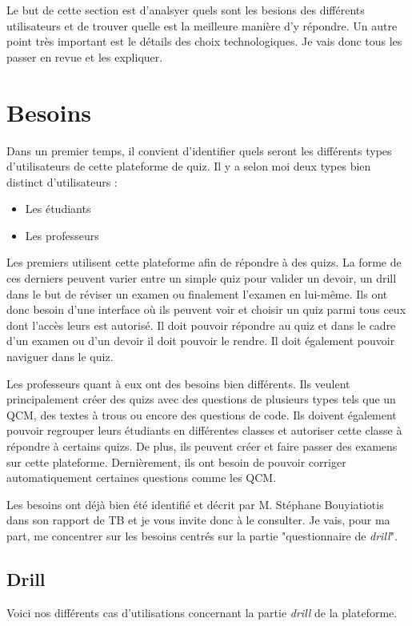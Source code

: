 Le but de cette section est d'analsyer quels sont les besions des différents utilisateurs et de trouver quelle est la meilleure manière d'y répondre. Un autre point très important est le détails des choix technologiques. Je vais donc tous les passer en revue et les expliquer.
\section{Besoins}

Dans un premier temps, il convient d'identifier quels seront les différents types d'utilisateurs de cette plateforme de quiz. Il y a selon moi deux types bien distinct d'utilisateurs :
\begin{itemize}
  \item Les étudiants
  \item Les professeurs
\end{itemize}

Les premiers utilisent cette plateforme afin de répondre à des quizs. La forme de ces derniers peuvent varier entre un simple quiz pour valider un devoir, un drill dans le but de réviser un examen ou finalement l'examen en lui-même. Ils ont donc besoin d'une interface où ils peuvent voir et choisir un quiz parmi tous ceux dont l'accès leurs est autorisé. Il doit pouvoir répondre au quiz et dans le cadre d'un examen ou d'un devoir il doit pouvoir le rendre. Il doit également pouvoir naviguer dans le quiz.

Les professeurs quant à eux ont des besoins bien différents. Ils veulent principalement créer des quizs avec des questions de plusieurs types tels que un QCM, des textes à trous ou encore des questions de code. Ils doivent également pouvoir regrouper leurs étudiants en différentes classes et autoriser cette classe à répondre à certains quizs. De plus, ils peuvent créer et faire passer des examens sur cette plateforme. Dernièrement, ils ont besoin de pouvoir corriger automatiquement certaines questions comme les QCM.

Les besoins ont déjà bien été identifié et décrit par M. Stéphane Bouyiatiotis dans son rapport de TB et je vous invite donc à le consulter. Je vais, pour ma part, me concentrer sur les besoins centrés sur la partie "questionnaire de \emph{drill}".

\subsection{Drill}

Voici nos différents cas d'utilisations concernant la partie \emph{drill} de la plateforme.

